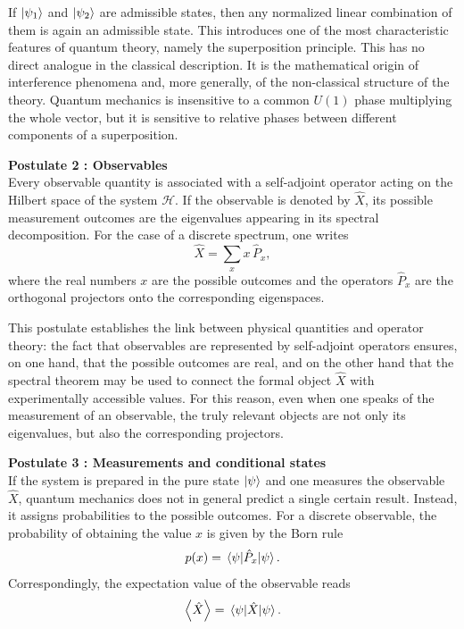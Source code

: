 If $\ket{\psi_1}$ and $\ket{\psi_2}$ are admissible states, then any normalized linear combination of them is again an admissible state. This introduces one of the most characteristic features of quantum theory, namely the superposition principle. This has no direct analogue in the classical description. It is the mathematical origin of interference phenomena and, more generally, of the non-classical structure of the theory.
Quantum mechanics is insensitive to a common $U(1)$ phase multiplying the whole vector, but it is sensitive to relative phases between different components of a superposition.

\medskip

\textbf{Postulate 2 : Observables}
\\
Every observable quantity is associated with a self-adjoint operator acting on the Hilbert space of the system $\mathcal{H}$. If the observable is denoted by $\hat X$, its possible measurement outcomes are the eigenvalues appearing in its spectral decomposition. For the case of a discrete spectrum, one writes
\begin{equation}
	\hat X=\sum_x x\,\hat P_x,
	\label{eq:intro_qm_spectral_decomposition}
\end{equation}
where the real numbers $x$ are the possible outcomes and the operators $\hat P_x$ are the orthogonal projectors onto the corresponding eigenspaces.

This postulate establishes the link between physical quantities and operator theory: the fact that observables are represented by self-adjoint operators ensures, on one hand, that the possible outcomes are real, and on the other hand that the spectral theorem may be used to connect the formal object $\hat X$ with experimentally accessible values. For this reason, even when one speaks of the measurement of an observable, the truly relevant objects are not only its eigenvalues, but also the corresponding projectors.

\medskip

\textbf{Postulate 3 : Measurements and conditional states}
\\
If the system is prepared in the pure state $\ket{\psi}$ and one measures the observable $\hat X$, quantum mechanics does not in general predict a single certain result. Instead, it assigns probabilities to the possible outcomes. For a discrete observable, the probability of obtaining the value $x$ is given by the Born rule
\begin{equation}
	p(x)=\matrixel{\psi}{\hat P_x}{\psi}.
	\label{eq:intro_qm_born_rule}
\end{equation}
Correspondingly, the expectation value of the observable reads
\begin{equation}
	\expval{\hat X}=\matrixel{\psi}{\hat X}{\psi}.
	\label{eq:intro_qm_expectation_value}
\end{equation}

